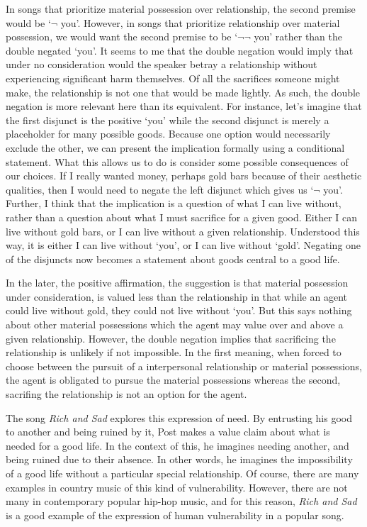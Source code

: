 \documentclass[phdthesis,12pt,final]{wuthesis}
\theoremstyle{definition}
\theoremstyle{definition}
\theoremstyle{definition}
\theoremstyle{definition}
\theoremstyle{remark}
\begin{document}
In songs that prioritize material possession over relationship, the second premise would be `\(\lnot\) you'. However, in songs that prioritize relationship over material possession, we would want the second premise to be `\(\lnot \lnot\) you' rather than the double negated `you'. It seems to me that the double negation would imply that under no consideration would the speaker betray a relationship without experiencing significant harm themselves. Of all the sacrifices someone might make, the relationship is not one that would be made lightly. As such, the double negation is more relevant here than its equivalent. For instance, let's imagine that the first disjunct is the positive `you' while the second disjunct is merely a placeholder for many possible goods. Because one option would necessarily exclude the other, we can present the implication formally using a conditional statement. What this allows us to do is consider some possible consequences of our choices. If I really wanted money, perhaps gold bars because of their aesthetic qualities, then I would need to negate the left disjunct which gives us `\(\lnot\) you'. Further, I think that the implication is a question of what I can live without, rather than a question about what I must sacrifice for a given good. Either I can live without gold bars, or I can live without a given relationship. Understood this way, it is either I can live without `you', or I can live without `gold'. Negating one of the disjuncts now becomes a statement about goods central to a good life.

In the later, the positive affirmation, the suggestion is that material possession under consideration, is valued less than the relationship in that while an agent could live without gold, they could not live without `you'. But this says nothing about other material possessions which the agent may value over and above a given relationship. However, the double negation implies that sacrificing the relationship is unlikely if not impossible. In the first meaning, when forced to choose between the pursuit of a interpersonal relationship or material possessions, the agent is obligated to pursue the material possessions whereas the second, sacrifing the relationship is not an option for the agent.

The song \emph{Rich and Sad} explores this expression of need. By entrusting his good to another and being ruined by it, Post makes a value claim about what is needed for a good life. In the context of this, he imagines needing another, and being ruined due to their absence. In other words, he imagines the impossibility of a good life without a particular special relationship. Of course, there are many examples in country music of this kind of vulnerability. However, there are not many in contemporary popular hip-hop music, and for this reason, \emph{Rich and Sad} is a good example of the expression of human vulnerability in a popular song.
\end{document}
